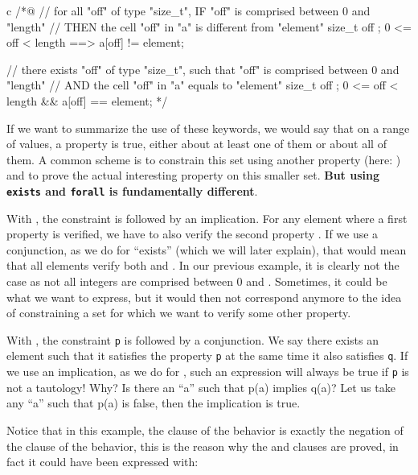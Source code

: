 \begin{CodeBlock}{c}
/*@
// for all "off" of type "size_t", IF "off" is comprised between 0 and "length"
//                                 THEN the cell "off" in "a" is different from "element"
\forall size_t off ; 0 <= off < length ==> a[off] != element;

// there exists "off" of type "size_t", such that "off" is comprised between 0 and "length"
//                                      AND the cell "off" in "a" equals to "element"
\exists size_t off ; 0 <= off < length && a[off] == element;
*/
\end{CodeBlock}


If we want to summarize the use of these keywords, we would say that on a
range of values, a property is true, either about at least one of them
or about all of them. A common scheme is to constrain this set using
another property (here: ) and to prove the
actual interesting property on this smaller set. \textbf{But using
\texttt{exists} and \texttt{forall} is fundamentally different}.


With ,
the constraint  is followed by an implication.
For any element where a first property  is verified, we have
to also verify the second property . If we use a conjunction,
as we do for ``exists'' (which we will later explain), that would mean that
all elements verify both  and . In our previous
example, it is clearly not the case as not all integers are comprised between
0 and . Sometimes, it could be what we want to express, but
it would then not correspond anymore to the idea of constraining a set for which
we want to verify some other property.


With , the
constraint \texttt{p} is followed by a conjunction. We say there exists
an element such that it satisfies the property \texttt{p} at the same
time it also satisfies \texttt{q}. If we use an implication, as we do
for , such an expression will always be true
if \texttt{p} is not a tautology! Why? Is there an ``a'' such that p(a) implies
q(a)? Let us take any ``a'' such that p(a) is false, then the implication is true.


Notice that in this example, the  clause of the
 behavior is exactly the negation of the 
clause of the  behavior, this is the reason why the
 and  clauses are proved, in fact it
could have been expressed with:


